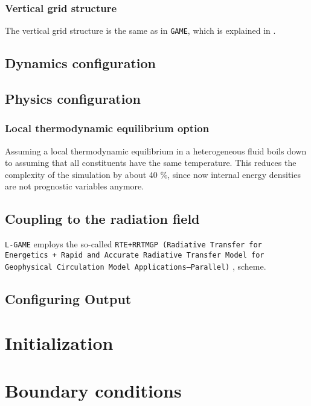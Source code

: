 \documentclass[10pt]{report}
\begin{document}
\subsection{Vertical grid structure}
\label{sec:vertical_grid_structure}

The vertical grid structure is the same as in \texttt{GAME}, which is explained in \cite{game_handbook}.

\section{Dynamics configuration}
\label{sec:dynamics_configuration}

\section{Physics configuration}
\label{sec:physics_configuration}

\subsection{Local thermodynamic equilibrium option}
\label{sec:local_thermodynamic_equilibrium_option}

Assuming a local thermodynamic equilibrium in a heterogeneous fluid boils down to assuming that all constituents have the same temperature. This reduces the complexity of the simulation by about 40 \%, since now internal energy densities are not prognostic variables anymore.

\section{Coupling to the radiation field}
\label{sec:coupling_to_the_radiation_field}

\texttt{L-GAME} employs the so-called \texttt{RTE+RRTMGP (Radiative Transfer for Energetics + Rapid and Accurate Radiative Transfer Model for Geophysical Circulation Model Applications—Parallel)} \cite{doi:10.1029/2019MS001621}, \cite{rte-rrtmgp-github} scheme.

\section{Configuring Output}
\label{sec:configuring_output}

\chapter{Initialization}
\label{sec:initialization}

\chapter{Boundary conditions}
\label{chap:boundary_conditions}

\appendix

\printbibliography
\end{document}
